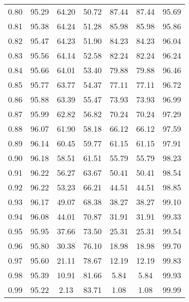 \begin{tabular}{|c|c|c|c|c|c|c|}
      0.80 &     95.29 &     64.20 &      50.72 &   87.44 &      87.44 &         95.69 \\
      0.81 &     95.38 &     64.24 &      51.28 &   85.98 &      85.98 &         95.86 \\
      0.82 &     95.47 &     64.23 &      51.90 &   84.23 &      84.23 &         96.04 \\
      0.83 &     95.56 &     64.14 &      52.58 &   82.24 &      82.24 &         96.24 \\
      0.84 &     95.66 &     64.01 &      53.40 &   79.88 &      79.88 &         96.46 \\
      0.85 &     95.77 &     63.77 &      54.37 &   77.11 &      77.11 &         96.72 \\
      0.86 &     95.88 &     63.39 &      55.47 &   73.93 &      73.93 &         96.99 \\
      0.87 &     95.99 &     62.82 &      56.82 &   70.24 &      70.24 &         97.29 \\
      0.88 &     96.07 &     61.90 &      58.18 &   66.12 &      66.12 &         97.59 \\
      0.89 &     96.14 &     60.45 &      59.77 &   61.15 &      61.15 &         97.91 \\
      0.90 &     96.18 &     58.51 &      61.51 &   55.79 &      55.79 &         98.23 \\
      0.91 &     96.22 &     56.27 &      63.67 &   50.41 &      50.41 &         98.54 \\
      0.92 &     96.22 &     53.23 &      66.21 &   44.51 &      44.51 &         98.85 \\
      0.93 &     96.17 &     49.07 &      68.38 &   38.27 &      38.27 &         99.10 \\
      0.94 &     96.08 &     44.01 &      70.87 &   31.91 &      31.91 &         99.33 \\
      0.95 &     95.95 &     37.66 &      73.50 &   25.31 &      25.31 &         99.54 \\
      0.96 &     95.80 &     30.38 &      76.10 &   18.98 &      18.98 &         99.70 \\
      0.97 &     95.60 &     21.11 &      78.67 &   12.19 &      12.19 &         99.83 \\
      0.98 &     95.39 &     10.91 &      81.66 &    5.84 &       5.84 &         99.93 \\
      0.99 &     95.22 &      2.13 &      83.71 &    1.08 &       1.08 &         99.99 \\
\bottomrule
\end{tabular}

